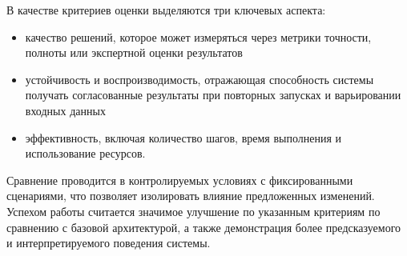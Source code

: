 В качестве критериев оценки выделяются три ключевых аспекта: 
\begin{itemize}
  \item качество решений, которое может измеряться через метрики точности, полноты или экспертной оценки результатов
  \item устойчивость и воспроизводимость, отражающая способность системы получать согласованные результаты при повторных запусках и варьировании входных данных
  \item эффективность, включая количество шагов, время выполнения и использование ресурсов. 
\end{itemize}

Сравнение проводится в контролируемых условиях с фиксированными сценариями, что позволяет изолировать влияние предложенных изменений. Успехом работы считается значимое улучшение по указанным критериям по сравнению с базовой архитектурой, а также демонстрация более предсказуемого и интерпретируемого поведения системы.
